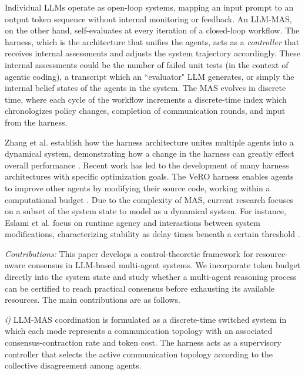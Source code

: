 \documentclass[journal,twoside,web]{ieeecolor_no_firstpage_logo}
\begin{document}
Individual LLMs operate as open-loop systems, mapping an input prompt to an output token sequence without internal monitoring or feedback. An LLM-MAS, on the other hand, self-evaluates at every iteration of a closed-loop workflow. The harness, which is the architecture that unifies the agents, acts as a \textit{controller} that receives internal assessments and adjusts the system trajectory accordingly. These internal assessments could be the number of failed unit tests (in the context of agentic coding), a transcript which an ``evaluator" LLM generates, or simply the internal belief states of the agents in the system. The MAS evolves in discrete time, where each cycle of the workflow increments a discrete-time index which chronologizes policy changes, completion of communication rounds, and input from the harness.

Zhang et al. establish how the harness architecture unites multiple agents into a dynamical system, demonstrating how a change in the harness can greatly effect overall performance \cite{bib31}. Recent work has led to the development of many harness architectures with specific optimization goals. The VeRO harness enables agents to improve other agents by modifying their source code, working within a computational budget \cite{bib32}.
Due to the complexity of MAS, current research focuses on a subset of the system state to model as a dynamical system. For instance, Eslami et al. focus on runtime agency and interactions between system modifications, characterizing stability as delay times beneath a certain threshold \cite{bib33}. 

\textit{Contributions:} This paper develops a control-theoretic framework for resource-aware consensus in LLM-based multi-agent systems. 
We incorporate token budget directly into the system state and study whether a multi-agent reasoning process can be certified to reach practical consensus before exhausting its available resources. The main contributions are as follows.

\textit{i)} LLM-MAS coordination is formulated as a discrete-time switched system in which each mode represents a communication topology with an associated consensus-contraction rate and token cost. The harness acts as a supervisory controller that selects the active communication topology according to the collective disagreement among agents.
\end{document}
